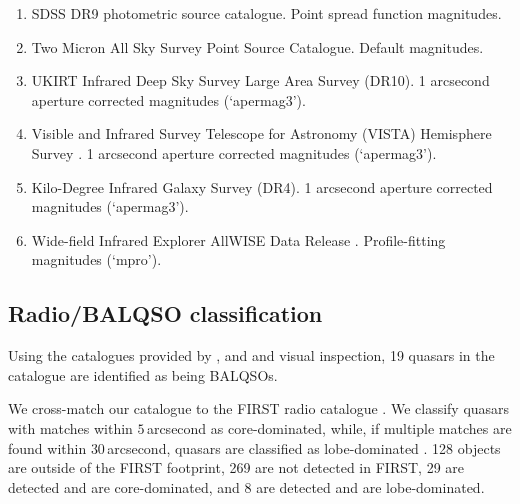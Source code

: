 \begin{enumerate}

 \item SDSS DR9 photometric source catalogue. Point spread function magnitudes. 

 \item Two Micron All Sky Survey \citep[2MASS;][]{skrutskie06} Point Source Catalogue. Default magnitudes.

 \item UKIRT Infrared Deep Sky Survey \citep[UKIDSS;][]{lawrence07} Large Area Survey (DR10). 1 arcsecond aperture corrected magnitudes (`apermag3').   

 \item Visible and Infrared Survey Telescope for Astronomy (VISTA) Hemisphere Survey \citep[VHS;][]{mcmahon13}. 1 arcsecond aperture corrected magnitudes (`apermag3').   

 \item Kilo-Degree Infrared Galaxy \citep[VIKING;][]{edge13} Survey (DR4). 1 arcsecond aperture corrected magnitudes (`apermag3').

 \item Wide-field Infrared Explorer \citep[WISE;][]{wright10} AllWISE Data Release \citep{mainzer11}. Profile-fitting magnitudes (`mpro').

\end{enumerate}

\subsection{Radio/BALQSO classification}
\label{sec:ch2-flags}

Using the catalogues provided by \citet{shen11}, \citet{allen11} and \citet{paris17} and visual inspection, 19 quasars in the catalogue are identified as being  BALQSOs.  

We cross-match our catalogue to the FIRST radio catalogue \citep{white97}. 
We classify quasars with matches within $5$\,arcsecond as core-dominated, while, if multiple matches are found within $30$\,arcsecond, quasars are classified as lobe-dominated \citep[e.g.][]{shen11}. 
128 objects are outside of the FIRST footprint, 269 are not detected in FIRST, 29 are detected and are core-dominated, and 8 are detected and are lobe-dominated. 

